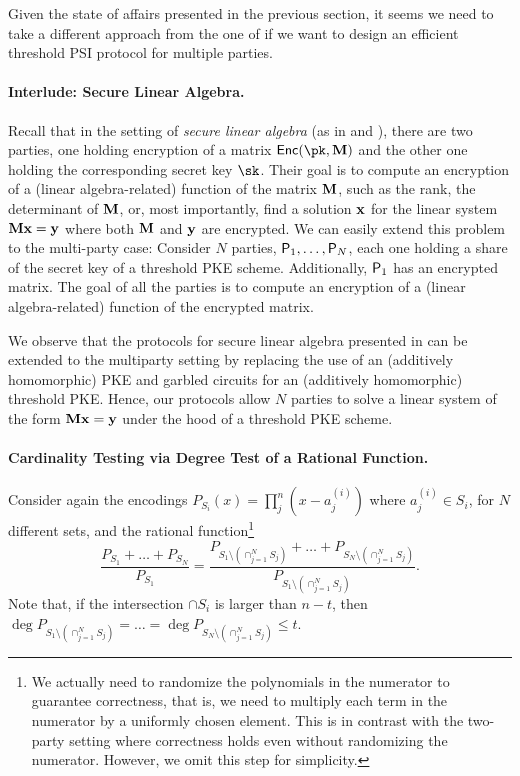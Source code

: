 Given the state of affairs presented in the previous section, it seems we need to take a different approach from the one of \cite{C:GhoSim19} if we want to design an efficient threshold PSI protocol for multiple parties.


\paragraph{Interlude: Secure Linear Algebra.} Recall that in the setting of \emph{secure linear algebra} (as in \cite{TCC:NisWei06} and \cite{TCC:KMWF07}), there are two parties, one holding encryption of a matrix $\mathsf{Enc}(\pk,\Mn)$ and the other one holding the corresponding secret key $\sk$. Their goal is to compute an encryption of a (linear algebra-related) function of the matrix $\mathbf{M}$, such as the rank, the determinant of $\mathbf{M}$, or, most importantly,  find a solution $\mathbf{x}$ for the linear system $\mathbf{M}\mathbf{x}=\mathbf{y}$ where both $\mathbf{M}$ and $\mathbf{y}$ are encrypted. We can easily extend this problem to the multi-party case: Consider $N$ parties, $\mathsf{P}_1,\dots, \mathsf{P}_N$, each one holding a share of the secret key of a threshold PKE scheme. Additionally, $\mathsf{P}_1$ has an encrypted matrix. The goal of all the parties is to compute an encryption of a (linear algebra-related) function of the encrypted matrix.


We observe that the protocols for secure linear algebra presented in \cite{TCC:KMWF07} can be extended to the multiparty setting by replacing the use of an (additively homomorphic) PKE and garbled circuits for an (additively homomorphic) threshold PKE\footnotemark. Hence, our protocols allow $N$ parties to solve a linear system of the form $\mathbf{M}\mathbf{x}=\mathbf{y}$ under the hood of a threshold PKE scheme.


\paragraph{Cardinality Testing via Degree Test of a Rational Function.}

Consider again the  encodings $P_{S_i}(x)=\prod_j^n (x-a^{(i)}_j)$ where $a^{(i)}_j\in S_i$, for $N$ different sets, and the rational function\footnote{We actually need to randomize the polynomials in the numerator to guarantee correctness, that is, we need to multiply each term in the numerator by a uniformly chosen element. This is in contrast with the two-party setting where correctness holds even without randomizing the numerator. However, we omit this step for simplicity.}  
$$\frac{P_{S_1}+\dots + P_{S_N}}{P_{S_1}}=\frac{P_{S_1\setminus (\cap_{j=1}^N S_j)}+ \dots +P_{S_N\setminus (\cap_{j=1}^{N} S_j)}}{P_{S_1\setminus (\cap_{j=1}^N S_j)}}.$$ Note that, if the intersection $\cap S_i $ is larger than $n-t$, then $\deg P_{S_1\setminus (\cap_{j=1}^N S_j)}=\dots =\deg P_{S_N\setminus (\cap_{j=1}^{N} S_j)}\leq t$.


